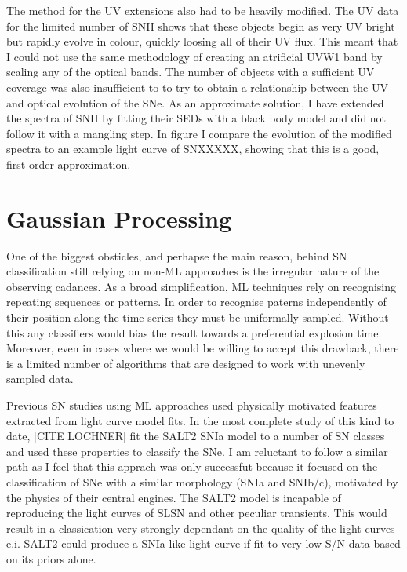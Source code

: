 The method for the UV extensions also had to be heavily modified. The UV data for the limited number of SNII shows that these objects begin as very UV bright but rapidly evolve in colour, quickly loosing all of their UV flux. This meant that I could not use the same methodology of creating an atrificial UVW1 band by scaling any of the optical bands. The number of objects with a sufficient UV coverage was also insufficient to to try to obtain a relationship between the UV and optical evolution of the SNe. As an approximate solution, I have extended the spectra of SNII by fitting their SEDs with a black body model and did not follow it with a mangling step. In figure  I compare the evolution of the modified spectra to an example light curve of SNXXXXX, showing that this is a good, first-order approximation.

\begin{figure}
  \caption{}
  \label{fig:SNIIbbExtension}
\end{figure}

\section{Gaussian Processing} \label{sec:GP}
One of the biggest obsticles, and perhapse the main reason, behind SN classification still relying on non-ML approaches is the irregular nature of the observing cadances. As a broad simplification, ML techniques rely on recognising repeating sequences or patterns. In order to recognise paterns independently of their position along the time series they must be uniformally sampled. Without this any classifiers would bias the result towards a preferential explosion time. Moreover, even in cases where we would be willing to accept this drawback, there is a limited number of algorithms that are designed to work with unevenly sampled data.

Previous SN studies using ML approaches used physically motivated features extracted from light curve model fits. In the most complete study of this kind to date, [CITE LOCHNER] fit the SALT2 SNIa model to a number of SN classes and used these properties to classify the SNe. I am reluctant to follow a similar path as I feel that this apprach was only successfut because it focused on the classification of SNe with a similar morphology (SNIa and SNIb/c), motivated by the physics of their central engines. The SALT2 model is incapable of reproducing the light curves of SLSN and other peculiar transients. This would result in a classication very strongly dependant on the quality of the light curves e.i. SALT2 could produce a SNIa-like light curve if fit to very low S/N data based on its priors alone.

